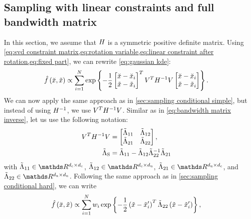 \subsection{Sampling with linear constraints and full bandwidth matrix}
\label{sec:sampling constrained hard}

In this section, we assume that $H$ is a symmetric positive definite matrix. 
Using \cref{eq:svd constraint matrix,eq:rotation variable,eq:linear constraint after rotation,eq:fixed part}, we can rewrite \cref{eq:gaussian kde}:
\begin{equation*}
	\hat{f}\left( \breve{x}, \tilde{x} \right) 
	\propto \sum_{i=1}^{N}
	\exp\left\{  -\frac{1}{2} 
		\begin{bmatrix} 
			\breve{x} - \breve{x}_{i} \\ 
			\tilde{x} - \tilde{x}_{i}
		\end{bmatrix}^T V^T H^{-1} V
		\begin{bmatrix} 
			\breve{x} - \breve{x}_{i} \\ 
			\tilde{x} - \tilde{x}_{i}
		\end{bmatrix}
	 \right\}.
\end{equation*}
We can now apply the same approach as in \cref{sec:sampling conditional simple}, but instead of using $H^{-1}$, we use $V^T H^{-1} V$.
Similar as in \cref{eq:bandwidth matrix inverse}, let us use the following notation:
\begin{align}
	V^T H^{-1} V 
	&= \begin{bmatrix} \tilde{\Lambda}_{11} & \tilde{\Lambda}_{12} \\ \tilde{\Lambda}_{21} & \tilde{\Lambda}_{22} \end{bmatrix}, \label{eq:rotated matrix inverse} \\
	\tilde{\Lambda}_{\mathrm{S}} &= \tilde{\Lambda}_{11} - \tilde{\Lambda}_{12} \tilde{\Lambda}_{22}^{-1} \tilde{\Lambda}_{21} \label{eq:rotated schur complement}
\end{align}
with $\bwriul \in \realnumbers^{\dimensionparta \times \dimensionparta}$, $\bwriur \in \realnumbers^{\dimensionparta \times \dimensionpartb}$, $\bwribl \in \realnumbers^{\dimensionpartb \times \dimensionparta}$, and $\bwribr \in \realnumbers^{\dimensionpartb \times \dimensionpartb}$. Following the same approach as in \cref{sec:sampling conditional hard}, we can write
\begin{equation*}
	\hat{f}\left( \breve{x}, \tilde{x} \right)
	\propto \sum_{i=1}^{N} w_{i}
	\exp\left\{  -\frac{1}{2} \left( \tilde{x} - \tilde{x}_{i}' \right)^T
		\tilde{\Lambda}_{22} \left( \tilde{x} - \tilde{x}_{i}' \right) \right\},
\end{equation*}
